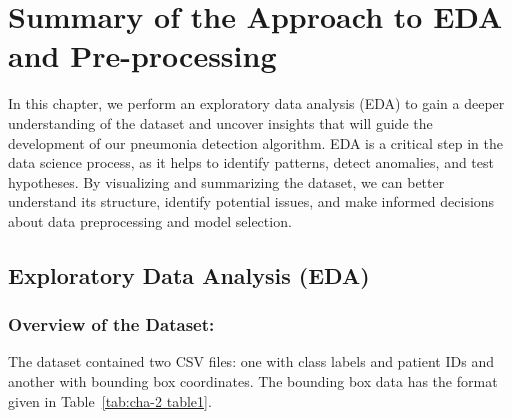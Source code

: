 \chapter{Summary of the Approach to EDA and Pre-processing}
\label{cha:chapter 2}

In this chapter, we perform an exploratory data analysis (EDA) to gain a deeper understanding of the dataset and uncover insights that will guide the development of our pneumonia detection algorithm. EDA is a critical step in the data science process, as it helps to identify patterns, detect anomalies, and test hypotheses. By visualizing and summarizing the dataset, we can better understand its structure, identify potential issues, and make informed decisions about data preprocessing and model selection.

\section{Exploratory Data Analysis (EDA)}
\label{sec:chap2 section 1}

\subsection{Overview of the Dataset:}
\label{subsec:chap2 section 1.1}

The dataset contained two CSV files: one with class labels and patient IDs and another with bounding box coordinates. The bounding box data has the format given in Table~\ref{tab:cha-2 table1}.

